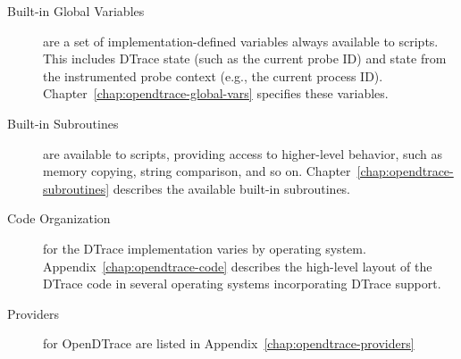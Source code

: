 \begin{description}
\item[Built-in Global Variables] are a set of implementation-defined
  variables always available to scripts.
  This includes DTrace state (such as the current probe ID) and state from the
  instrumented probe context (e.g., the current process ID).
  Chapter~\ref{chap:opendtrace-global-vars} specifies these variables.

\item[Built-in Subroutines] are available to scripts, providing access to
  higher-level behavior, such as memory copying, string comparison, and so on.
  Chapter~\ref{chap:opendtrace-subroutines} describes the available built-in
  subroutines.

\item[Code Organization] for the DTrace implementation varies by operating
  system.
  Appendix~\ref{chap:opendtrace-code} describes the high-level layout of the
  DTrace code in several operating systems incorporating DTrace support.

\item[Providers] for OpenDTrace are listed in
  Appendix~\ref{chap:opendtrace-providers}

\end{description}
